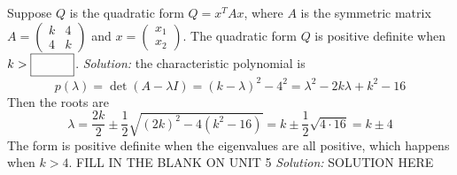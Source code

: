 \fi 
\ifnum {} %
    Suppose $Q$ is the quadratic form \(Q = x^TAx\), where \(A\) is the symmetric matrix \(A = \begin{pmatrix} k & 4 \\ 4 & k \end{pmatrix}\) and $x = \begin{pmatrix} x_1\\x_2 \end{pmatrix}$. The quadratic form \(Q\) is positive definite when $k > \framebox{\strut\hspace{1cm}}$. 
    \ifnum {} {\color{DarkBlue} \textit{Solution:} the characteristic polynomial is 
    $$p(\lambda) 
    = \det(A - \lambda I) 
    = (k-\lambda)^2 - 4^2 
    = \lambda^2 -2k\lambda + k^2 - 16$$
    Then the roots are
    $$\lambda  = \frac{2k}{2} \pm \frac12 \sqrt{(2k)^2 - 4( k^2 - 16)} = k \pm \frac12 \sqrt{4\cdot 16} = k \pm 4$$
    The form is positive definite when the eigenvalues are all positive, which happens when $k > 4$.  } \fi    
\fi 
\ifnum {} %
    FILL IN THE BLANK ON UNIT 5
    \ifnum {} {\color{DarkBlue} \textit{Solution:} SOLUTION HERE  } \fi    
\fi 



